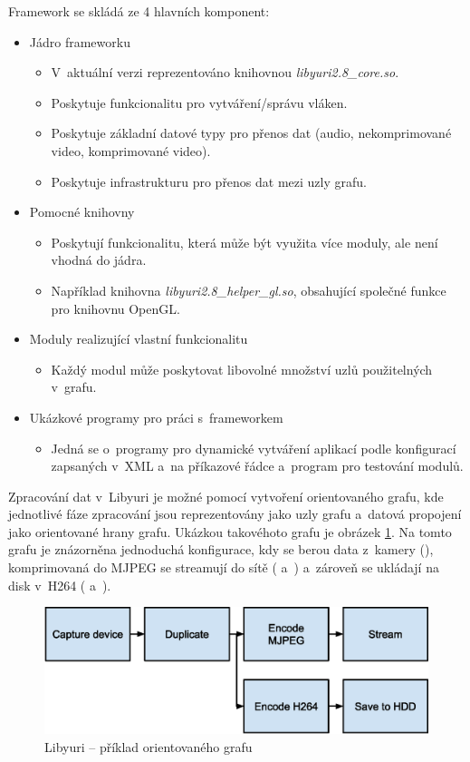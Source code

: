 \documentclass[thesis=M,czech]{FITthesis}[2012/06/26]
\begin{document}
Framework se skládá ze 4 hlavních komponent:
\begin{itemize}
\item Jádro frameworku
  \begin{itemize}
  	\item V~aktuální verzi reprezentováno knihovnou \textit{libyuri2.8\_core.so}.
    \item Poskytuje funkcionalitu pro vytváření/správu vláken.
    \item Poskytuje základní datové typy pro přenos dat (audio, nekomprimované video, komprimované video).
    \item Poskytuje infrastrukturu pro přenos dat mezi uzly grafu.
  \end{itemize}
\item Pomocné knihovny
  \begin{itemize}
    \item Poskytují funkcionalitu, která může být využita více moduly, ale není vhodná do jádra.
  	\item Například knihovna \textit{libyuri2.8\_helper\_gl.so}, obsahující společné funkce pro knihovnu OpenGL.
  \end{itemize}
\item Moduly realizující vlastní funkcionalitu
  \begin{itemize}
    \item Každý modul může poskytovat libovolné množství uzlů použitelných v~grafu.
  \end{itemize}
\item Ukázkové programy pro práci s~frameworkem
  \begin{itemize}
    \item Jedná se o~programy pro dynamické vytváření aplikací podle konfigurací zapsaných v~XML a~na příkazové řádce a~program pro testování modulů.
  \end{itemize}
\end{itemize}

Zpracování dat v~Libyuri je možné pomocí vytvoření orientovaného grafu, kde jednotlivé fáze zpracování jsou reprezentovány jako uzly grafu a~datová propojení jako orientované hrany grafu. Ukázkou takovéhoto grafu je obrázek \ref{img:yuri_example}.
Na tomto grafu je znázorněna jednoduchá konfigurace, kdy se berou data z~kamery (), komprimovaná do MJPEG  se streamují do sítě ( a~) a~zároveň se ukládají na disk v~H264 ( a~).
\\
\begin{figure}[h]\centering
	\includegraphics[width=1\textwidth]{images/yuri_example.eps}
	\caption{Libyuri -- příklad orientovaného grafu}\label{img:yuri_example}
\end{figure}
\end{document}

